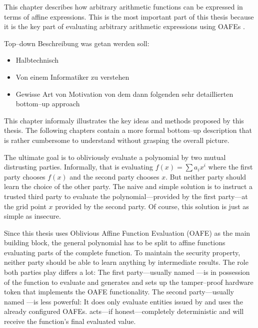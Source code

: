 \label{sec:methods}

This chapter describes how arbitrary arithmetic functions can be expressed in
terms of affine expressions. This is the most important part of this thesis
because it is the key part of evaluating arbitrary arithmetic expressions
using OAFEs \cite{davidgoliath}.

\begin{JWtodoBox}

  Top--down Beschreibung was getan werden soll:

  \begin{itemize}

    \item Halbtechnisch

    \item Von einem Informatiker zu verstehen

    \item Gewisse Art von Motivation von dem dann folgenden sehr detaillierten
      bottom--up approach

  \end{itemize}

\end{JWtodoBox}


%
%
\label{sec:illustration}

This chapter informaly illustrates the key ideas and methods proposed by this
thesis. The following chapters contain a more formal bottom--up description that
is rather cumbersome to understand without grasping the overall picture.

The ultimate goal is to obliviously evaluate a polynomial by two mutual
distrusting parties. Informally, that is evaluating $f(x) = \sum a_ix^i$ where
the first party chooses $f(x)$ and the second party chooses $x$. But neither
party should learn the choice of the other party. The naive and simple solution
is to instruct a trusted third party to evaluate the polynomial---provided by
the first party---at the grid point $x$ provided by the second party.
Of course, this solution is just as simple as insecure.

Since this thesis uses Oblivious Affine Function Evaluation (OAFE) as the main
building block, the general polynomial has to be split to affine functions
evaluating parts of the complete function. To maintain the security property,
neither party should be able to learn anything by intermediate results. The role
both parties play differs a lot: The first party---usually named \JWpOne{}---is
in possession of the function to evaluate and generates and sets up the
tamper--proof hardware token that implements the OAFE functionality. The second
party---usually named \JWpTwo{}---is less powerful: It does only evaluate
entities issued by \JWpOne{} and uses the already configured OAFEs. \JWpTwo{}
acts---if honest---completely deterministic and will receive the function's
final evaluated value.

